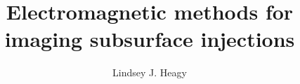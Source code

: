 \documentclass[gpscopy,doublespacing,12pt]{ubcdiss}
\title{Electromagnetic methods for imaging subsurface injections}
\author{Lindsey J. Heagy}
\begin{document}

\maketitle

\makecommitteepage


\cleardoublepage


\cleardoublepage


\cleardoublepage

\tableofcontents
\cleardoublepage    %
{}
\listoftables
\cleardoublepage    %

\listoffigures
\cleardoublepage    %




\textspacing        %





\mainmatter

\acresetall %








\end{document}
